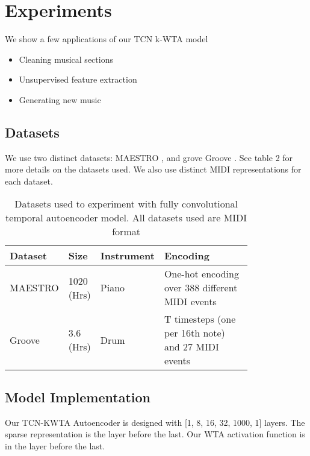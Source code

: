 \documentclass[11pt,a4paper]{article}
\begin{document}
\section{Experiments}
\label{ssec:experiments}

We show a few applications of our TCN k-WTA model

\begin{itemize}
\item Cleaning musical sections
\item Unsupervised feature extraction 
\item Generating new music
\end{itemize}


\subsection{Datasets}
\label{ssec:experiments}

We use two distinct datasets: MAESTRO  \citep{Gusfield:97}, and  grove Groove  \citep{Gusfield:97} . See table 2 for more details on the datasets used. We also use distinct MIDI representations for each dataset. 



\begin{table*}[ht]
    \centering
    \begin{tabular}{p{0.15\linewidth} | p{0.1\linewidth} | p{0.1\linewidth}  | p{0.45\linewidth} }
      Dataset  & Size  & Instrument &  Encoding\\ \hline
      MAESTRO \citep{Gusfield:97}  & 1020 (Hrs)   & Piano &  One-hot encoding over 388 different MIDI events \\
        \hline
        Groove \citet{Gusfield:97} & 3.6 (Hrs)  & Drum &  T timesteps (one per 16th note) and 27 MIDI events\\
    \end{tabular}
    \caption{Datasets used to experiment with fully convolutional temporal autoencoder model. All datasets used are MIDI format }
    \label{tab:my_label}
\end{table*}




\subsection{Model Implementation}

Our TCN-KWTA Autoencoder is designed with [1, 8, 16, 32, 1000, 1] layers. The sparse representation is the layer before the last. Our WTA activation function is in the layer before the last. 
\end{document}
